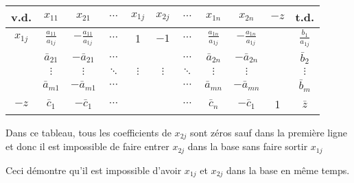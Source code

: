 \begin{center}
	\renewcommand{\arraystretch}{1.5}
	\begin{tabular}{|c|ccccccccc|c|}
		\hline
		  v.d.   &        $x_{11}$         &         $x_{21}$         & $\cdots$ & $x_{1j}$ & $x_{2j}$ & $\cdots$ &        $x_{1n}$         &         $x_{2n}$         & $-z$ &          t.d.          \\ \hline
		$x_{1j}$ & $\frac{a_{11}}{a_{1j}}$ & $-\frac{a_{11}}{a_{1j}}$ & $\cdots$ &    1     &   $-1$   & $\cdots$ & $\frac{a_{1n}}{a_{1j}}$ & $-\frac{a_{1n}}{a_{1j}}$ &      & $\frac{b_{1}}{a_{1j}}$ \\
		         &     $\bar{a}_{21}$      &     $-\bar{a}_{21}$      & $\cdots$ &          &          & $\cdots$ &     $\bar{a}_{2n}$      &     $-\bar{a}_{2n}$      &      &     $\bar{b}_{2}$      \\
		         &        $\vdots$         &         $\vdots$         & $\ddots$ & $\vdots$ & $\vdots$ & $\ddots$ &        $\vdots$         &         $\vdots$         &      &        $\vdots$        \\
		         &     $\bar{a}_{m1}$      &     $-\bar{a}_{m1}$      & $\cdots$ &          &          & $\cdots$ &     $\bar{a}_{mn}$      &     $-\bar{a}_{mn}$      &      &      $\bar{b}_m$       \\ \hline
		  $-z$   &      $\bar{c}_{1}$      &       $-\bar{c}_1$       & $\cdots$ &          &          & $\cdots$ &       $\bar{c}_n$       &       $-\bar{c}_1$       &  1   &       $\bar{z}$        \\ \hline
	\end{tabular}
\end{center}

Dans ce tableau, tous les coefficients de $x_{2j}$ sont zéros sauf dans la première ligne et donc il est impossible de faire entrer $x_{2j}$ dans la base sans faire sortir $x_{1j}$

Ceci démontre qu’il est impossible d’avoir $x_{1j}$ et $x_{2j}$ dans la base en même temps.
